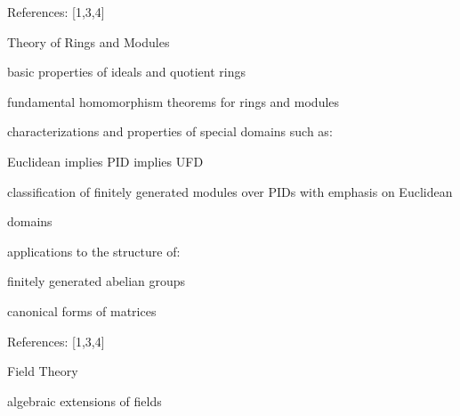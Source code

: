 \documentclass[a4paper,portrait,12pt]{article}
\begin{document}
\begin{flushleft}
References: [1,3,4]
\end{flushleft}


\begin{flushleft}
Theory of Rings and Modules
\end{flushleft}


\begin{flushleft}
basic properties of ideals and quotient rings
\end{flushleft}


\begin{flushleft}
fundamental homomorphism theorems for rings and modules
\end{flushleft}


\begin{flushleft}
characterizations and properties of special domains such as:
\end{flushleft}


\begin{flushleft}
Euclidean implies PID implies UFD
\end{flushleft}


\begin{flushleft}
classification of finitely generated modules over PIDs with emphasis on Euclidean
\end{flushleft}


\begin{flushleft}
domains
\end{flushleft}


\begin{flushleft}
applications to the structure of:
\end{flushleft}


\begin{flushleft}
finitely generated abelian groups
\end{flushleft}


\begin{flushleft}
canonical forms of matrices
\end{flushleft}


\begin{flushleft}
References: [1,3,4]
\end{flushleft}





\begin{flushleft}
\newpage
Field Theory
\end{flushleft}


\begin{flushleft}
algebraic extensions of fields
\end{flushleft}
\end{document}

